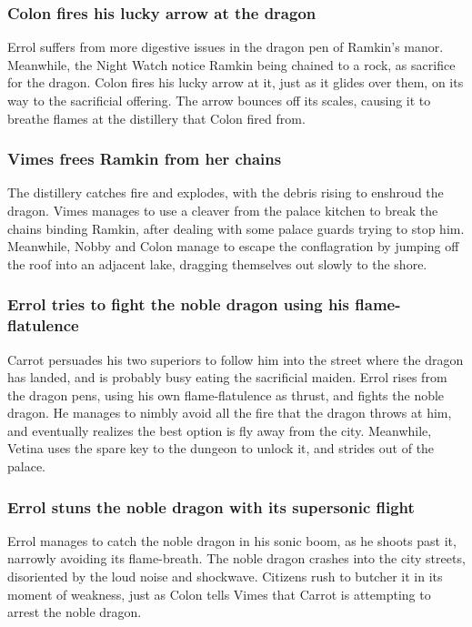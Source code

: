 \subsubsection{\Gls{Colon} fires his lucky arrow at the dragon}
\Gls{Errol} suffers from more digestive issues in the dragon pen of \Gls{Ramkin}'s manor. Meanwhile,
the Night Watch notice \Gls{Ramkin} being chained to a rock, as sacrifice for the dragon.
\Gls{Colon} fires his lucky arrow at it, just as it glides over them, on its way to the sacrificial
offering. The arrow bounces off its scales, causing it to breathe flames at the distillery that
\Gls{Colon} fired from.

\subsubsection{\Gls{Vimes} frees \Gls{Ramkin} from her chains}
The distillery catches fire and explodes, with the debris rising to enshroud the dragon. \Gls{Vimes}
manages to use a cleaver from the palace kitchen to break the chains binding \Gls{Ramkin}, after
dealing with some palace guards trying to stop him. Meanwhile, \Gls{Nobby} and \Gls{Colon} manage
to escape the conflagration by jumping off the roof into an adjacent lake, dragging themselves out
slowly to the shore.

\subsubsection{\Gls{Errol} tries to fight the noble dragon using his flame-flatulence}
\Gls{Carrot} persuades his two superiors to follow him into the street where the dragon has landed,
and is probably busy eating the sacrificial maiden. \Gls{Errol} rises from the dragon pens, using
his own flame-flatulence as thrust, and fights the noble dragon. He manages to nimbly avoid all the
fire that the dragon throws at him, and eventually realizes the best option is fly away from the
city. Meanwhile, \Gls{Vetina} uses the spare key to the dungeon to unlock it, and strides out of the
palace.

\subsubsection{\Gls{Errol} stuns the noble dragon with its supersonic flight}
\Gls{Errol} manages to catch the noble dragon in his sonic boom, as he shoots past it, narrowly
avoiding its flame-breath. The noble dragon crashes into the city streets, disoriented by the loud
noise and shockwave. Citizens rush to butcher it in its moment of weakness, just as \Gls{Colon}
tells \Gls{Vimes} that \Gls{Carrot} is attempting to arrest the noble dragon.

